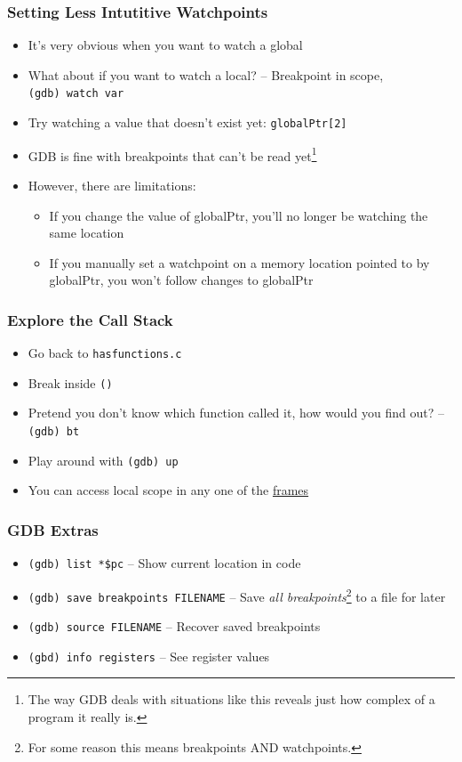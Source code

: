 \documentclass[aspectratio=169]{beamer}
\newcommand{\code}{\texttt}
\newcommand{\fn}{\color{identifier}}
\begin{document}
\begin{frame}
    \frametitle{Setting Less Intutitive Watchpoints}
    \begin{itemize}
        \item It's very obvious when you want to watch a global
        \item What about if you want to watch a local? \pause -- Breakpoint in scope, \code{(gdb)~watch~var}
        \item Try watching a value that doesn't exist yet: \code{globalPtr[2]}
        \pause
        \item GDB is fine with breakpoints that can't be read yet\footnote[frame]{The way GDB deals with situations like this reveals just how complex of a program it really is.}
        \pause
        \item However, there are limitations:
        \begin{itemize}
            \item If you change the value of globalPtr, you'll no longer be watching the same location
            \item If you manually set a watchpoint on a memory location pointed to by globalPtr, you won't follow changes to globalPtr
        \end{itemize}
    \end{itemize}

\end{frame}
\begin{frame}
    \frametitle{Explore the Call Stack}

    \begin{itemize}
        \item Go back to \code{hasfunctions.c}
        \item Break inside \code{\fn{goodNumber}}\code{()}
        \item Pretend you don't know which function called it, how would you find out? \pause -- \code{(gdb) bt}
        \pause
        \item Play around with \code{(gdb) up}
        \item You can access local scope in any one of the \underline{frames}
    \end{itemize}

\end{frame}
\begin{frame}
    \frametitle{GDB Extras}
    \begin{itemize}
        \item \code{(gdb) list *\$pc} -- Show current location in code
        \item \code{(gdb) save breakpoints FILENAME} -- Save \textit{all breakpoints}\footnote[frame]{For some reason this means breakpoints AND watchpoints.} to a file for later
        \item \code{(gdb) source FILENAME} -- Recover saved breakpoints
        \item \code{(gbd) info registers} -- See register values
    \end{itemize}
    

\end{frame}
\end{document}
